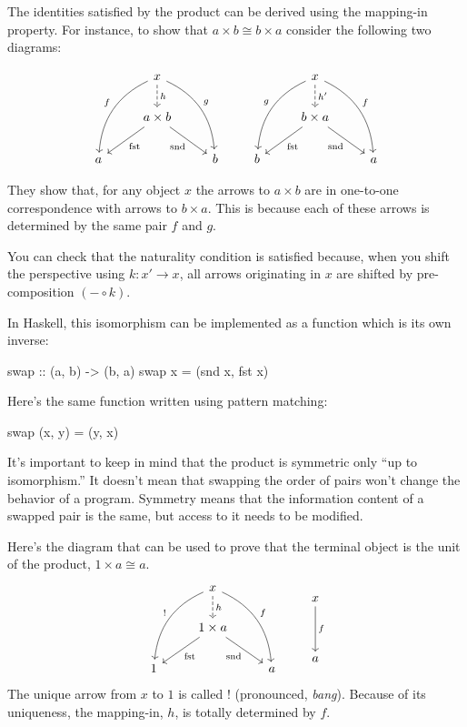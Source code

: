 \documentclass[DaoFP]{subfiles}
\begin{document}
The identities satisfied by the product can be derived using the mapping-in property. For instance, to show that $a \times b \cong b \times a$ consider the following two diagrams:

\[
 \begin{tikzcd}
 &x
 \arrow[d, dashed, "h"]
 \arrow[ddl, bend right, "f"']
 \arrow[ddr, bend left, "g"]
 \\
 & a \times b
  \arrow[dl,  "\text{fst}"]
 \arrow[dr,   "\text{snd}"']
 \\
a && b
 \end{tikzcd}
 \qquad
 \begin{tikzcd}
 &x
 \arrow[d, dashed, "h'"]
 \arrow[ddl, bend right, "g"']
 \arrow[ddr, bend left, "f"]
 \\
 & b \times a
  \arrow[dl,  "\text{fst}"]
 \arrow[dr,   "\text{snd}"']
\\
b && a
  \end{tikzcd}
\]

They show that, for any object $x$ the arrows to $a \times b$ are in one-to-one correspondence with arrows to $b \times a$. This is because each of these arrows is determined by the same pair $f$ and $g$. 

You can check that the naturality condition is satisfied because, when you shift the perspective using $k \colon x' \to x$, all arrows originating in $x$ are shifted by pre-composition $(- \circ k)$.

In Haskell, this isomorphism can be implemented as a function which is its own inverse:
\begin{haskell}
swap :: (a, b) -> (b, a)
swap x = (snd x, fst x)
\end{haskell}
Here's the same function written using pattern matching:
\begin{haskell}
swap (x, y) = (y, x)
\end{haskell}

It's important to keep in mind that the product is symmetric only ``up to isomorphism.'' It doesn't mean that swapping the order of pairs won't change the behavior of a program. Symmetry means that the information content of a swapped pair is the same, but access to it needs to be modified.

Here's the diagram that can be used to prove that the terminal object is the unit of the product, $1 \times a \cong a$.
\[
 \begin{tikzcd}
 &x
 \arrow[d, dashed, "h"]
 \arrow[ddl, bend right, "!"']
 \arrow[ddr, bend left, "f"]
 \\
 & 1 \times a
  \arrow[dl,  "\text{fst}"]
 \arrow[dr,   "\text{snd}"']
 \\
1 && a
 \end{tikzcd}
 \qquad
 \begin{tikzcd}
 x
 \arrow[dd, "f"]
\\
\\
a
  \end{tikzcd}
\]
The unique arrow from $x$ to $1$ is called \index{!}$!$ (pronounced, \emph{bang}). Because of its uniqueness, the mapping-in, $h$, is totally determined by $f$.
\end{document}
